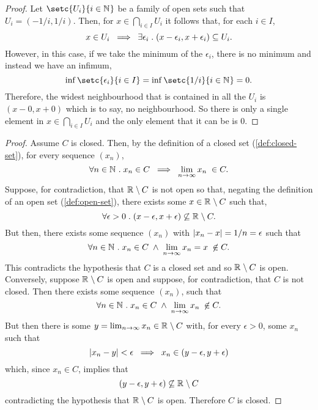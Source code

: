 \documentclass[../MathsNotesBase.tex]{subfiles}
\begin{document}
{		\bigskip
		\begin{proof}
			Let ${ \setc{U_i}{i \in \N{}} }$ be a family of open sets such that ${ U_i = (-1/i, 1/i) }$. Then, for ${ x \in \bigcap_{i \in I} U_i }$ it follows that, for each ${ i \in I }$,
			\[ x \in U_i \; \implies \; \exists \epsilon_i \;.\; (x - \epsilon_i, x + \epsilon_i) \subseteq U_i. \]
			However, in this case, if we take the minimum of the $\epsilon_i$, there is no minimum and instead we have an infimum,
			\[ \inf \setc{\epsilon_i}{i \in I} = \inf \setc{1/i}{i \in \N{}} = 0. \]
			Therefore, the widest neighbourhood that is contained in all the $U_i$ is ${ (x - 0, x + 0) }$ which is to say, no neighbourhood. So there is only a single element in ${ x \in \bigcap_{i \in I} U_i }$ and the only element that it can be is 0.
		\end{proof}
	
		
		\bigskip
		\begin{proof}
			Assume $C$ is closed. Then, by the definition of a closed set (\ref{def:closed-set}), for every sequence $(x_n)$,
			\[ \forall n \in \mathbb{N}^{} \;.\; x_n \in C \; \implies \; \lim_{n \to \infty} x_n \; \in C. \]
			Suppose, for contradiction, that ${ \mathbb{R}^{} \setminus C }$ is not open so that, negating the definition of an open set (\ref{def:open-set}), there exists some ${ x \in \mathbb{R}^{} \setminus C }$ such that,
			\[ \forall \epsilon > 0 \logicsep (x - \epsilon, x + \epsilon) \centernot\subseteq \R{} \setminus C. \]
			But then, there exists some sequence $(x_n)$ with ${ \left\lvert x_n - x\right\rvert = 1/n = \epsilon }$ such that
			\[ \forall n \in \N{} \logicsep x_n \in C \; \land \; \lim_{n \to \infty} x_n = x \; \centernot\in C. \]
			This contradicts the hypothesis that $C$ is a closed set and so ${ \mathbb{R}^{} \setminus C }$ is open.\\
			
			\nl
			Conversely, suppose ${ \mathbb{R}^{} \setminus C }$ is open and suppose, for contradiction, that $C$ is not closed. Then there exists some sequence $(x_n)$, such that
			\[ \forall n \in \N{} \logicsep x_n \in C \; \land \; \lim_{n \to \infty} x_n \; \centernot\in C. \]
			But then there is some ${ y = \lim_{n \to \infty} x_n \in \mathbb{R}^{} \setminus C }$ with, for every ${ \epsilon > 0 }$, some $x_n$ such that
			\[ \left\lvert x_n - y\right\rvert < \epsilon \; \implies \; x_n \in (y - \epsilon, y + \epsilon) \]
			which, since ${ x_n \in C }$, implies that
			\[ (y - \epsilon, y + \epsilon) \centernot\subseteq \R{} \setminus C \]
			contradicting the hypothesis that ${ \mathbb{R}^{} \setminus C }$ is open. Therefore $C$ is closed.
		\end{proof}
	
}
\end{document}
